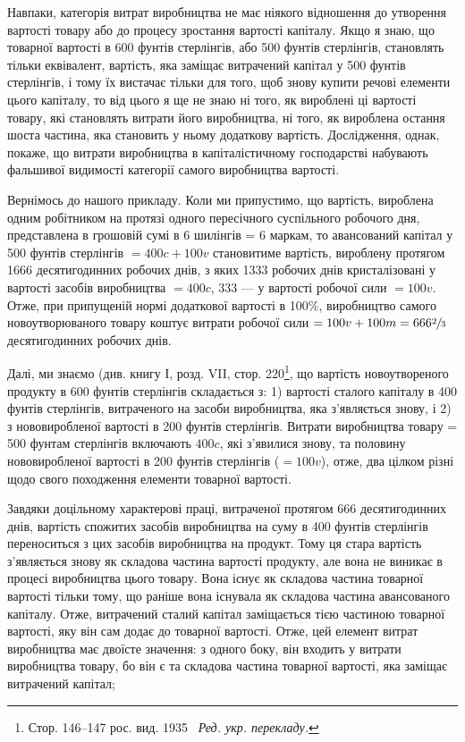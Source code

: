 
Навпаки, категорія витрат виробництва не має ніякого відношення
до утворення вартості товару або до процесу зростання
вартості капіталу. Якщо я знаю, що  товарної вартості
в 600 фунтів стерлінгів, або 500 фунтів стерлінгів, становлять
тільки еквівалент, вартість, яка заміщає витрачений капітал
у 500 фунтів стерлінгів, і тому їх вистачає тільки для того, щоб
знову купити речові елементи цього капіталу, то від цього
я ще не знаю ні того, як вироблені ці   вартості товару, які
становлять витрати його виробництва, ні того, як вироблена
остання шоста частина, яка становить у ньому додаткову вартість.
Дослідження, однак, покаже, що витрати виробництва в капіталістичному
господарстві набувають фальшивої видимості категорії
самого виробництва вартості.

Вернімось до нашого прикладу. Коли ми припустимо, що вартість,
вироблена одним робітником на протязі одного пересічного
суспільного робочого дня, представлена в грошовій сумі
в 6 шилінгів = 6 маркам, то авансований капітал у 500 фунтів
стерлінгів $= 400 c + 100 v$ становитиме вартість, вироблену протягом
1666 десятигодинних робочих днів, з яких 1333 робочих
днів кристалізовані у вартості засобів виробництва $= 400 c$,
333  — у вартості робочої сили $= 100v$. Отже, при припущеній
нормі додаткової вартості в 100\%, виробництво самого новоутворюваного
товару коштує витрати робочої сили $= 100v + 100m = 666\sfrac{2}{3}$ десятигодинних робочих днів.

Далі, ми знаємо (див. книгу І, розд. VII, стор. 220\footnote*{Стор. 146--147 рос. вид. 1935~ \emph{Ред. укр. перекладу.}}, що вартість
новоутвореного продукту в 600 фунтів стерлінгів складається
з: 1) вартості сталого капіталу в 400 фунтів стерлінгів,
витраченого на засоби виробництва, яка з’являється знову, і
2) з нововиробленої вартості в 200 фунтів стерлінгів. Витрати
виробництва товару = 500 фунтам стерлінгів включають $400 c$,
які з’явилися знову, та половину нововиробленої вартості в
200 фунтів стерлінгів ($= 100 v$), отже, два цілком різні щодо
свого походження елементи товарної вартості.

Завдяки доцільному характерові праці, витраченої протягом
666  десятигодинних днів, вартість спожитих засобів виробництва
на суму в 400 фунтів стерлінгів переноситься з цих
засобів виробництва на продукт. Тому ця стара вартість з’являється
знову як складова частина вартості продукту, але вона
не виникає в процесі виробництва цього товару. Вона існує як
складова частина товарної вартості тільки тому, що раніше вона
існувала як складова частина авансованого капіталу. Отже, витрачений
сталий капітал заміщається тією частиною товарної
вартості, яку він сам додає до товарної вартості. Отже, цей
елемент витрат виробництва має двоїсте значення: з одного боку,
він входить у витрати виробництва товару, бо він є та складова
частина товарної вартості, яка заміщає витрачений капітал;
\parbreak{}  %
